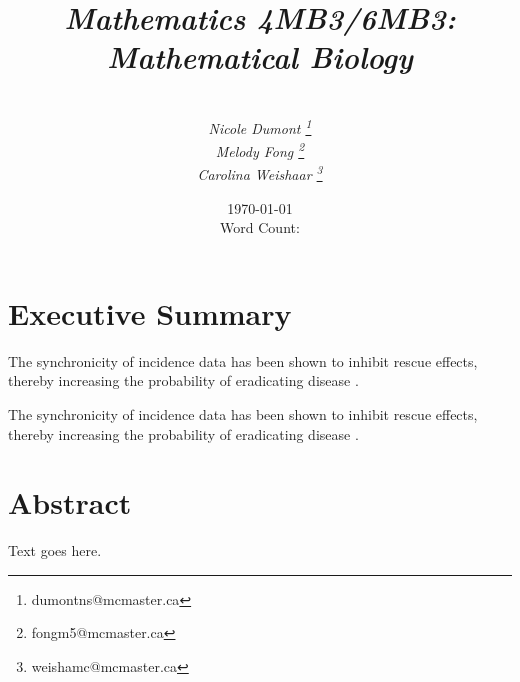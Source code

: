 \documentclass[twocolumn,nofootinbib,showkeys,twoside,floatfix,unsortedaddress,flushbottom,10pt,aps,pra]{report}
\author{\sc{\bfseries Model Students:}\\
\small \emph{Nicole Dumont \footnote{dumontns@mcmaster.ca}} \\
 \small \emph{Melody Fong \footnote{fongm5@mcmaster.ca}} \\
 \small  \emph{Carolina Weishaar \footnote{weishamc@mcmaster.ca}}}
\title{ \small \emph{Mathematics 4MB3/6MB3: Mathematical Biology }\\
  \Huge \sc{\bfseries Spatial Epidemics Dynamics:\\ Synchronization}}
\date{\today \\
  Word Count: }
\begin{document}
\pagestyle{fancy}

\maketitle
\tableofcontents

\onecolumn
\section*{\Huge Executive Summary}

The synchronicity of incidence data has been shown to inhibit rescue effects, thereby increasing the probability of eradicating disease \cite{McCluskey2011}. 

%

The synchronicity of incidence data has been shown to inhibit rescue effects, thereby increasing the probability of eradicating disease \cite{McCluskley2014}. 



\twocolumn

\section{Abstract} Text goes here.
\end{document}
